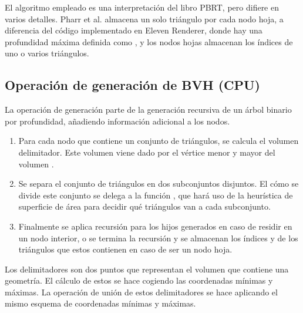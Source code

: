 El algoritmo empleado es una interpretación del libro PBRT, pero difiere en varios detalles. Pharr et al. \cite{pharr2016physically} almacena un solo triángulo por cada nodo hoja, a diferencia del código implementado en Eleven Renderer, donde hay una profundidad máxima definida como , y los nodos hojas almacenan los índices de uno o varios triángulos. 

\subsection{Operación de generación de BVH (CPU)}

La operación de generación parte de la generación recursiva de un árbol binario por profundidad, añadiendo información adicional a los nodos.

\begin{enumerate}
	
\item Para cada nodo que contiene un conjunto de triángulos, se calcula el volumen delimitador. Este volumen viene dado por el vértice menor y mayor del volumen .

\item Se separa el conjunto de triángulos en dos subconjuntos disjuntos. El cómo se divide este conjunto se delega a la función , que hará uso de la heurística de superficie de área para decidir qué triángulos van a cada subconjunto.

\item Finalmente se aplica recursión para los hijos generados en caso de residir en un nodo interior, o se termina la recursión y se almacenan los índices  y  de los triángulos que estos contienen en caso de ser un nodo hoja.

\end{enumerate}

Los delimitadores son dos puntos que representan el volumen que contiene una geometría. El cálculo de estos se hace cogiendo las coordenadas mínimas y máximas. La operación de unión de estos delimitadores se hace aplicando el mismo esquema de coordenadas mínimas y máximas.

